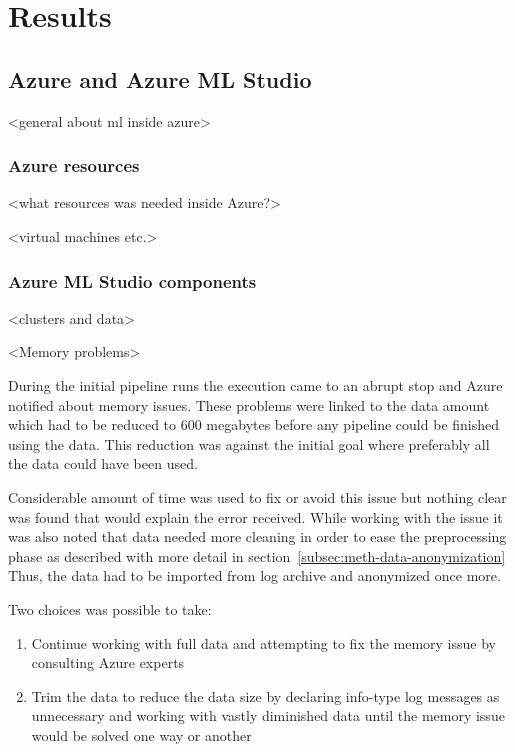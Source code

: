

\section{Results}\label{sec:results}


\subsection{Azure and Azure ML Studio}\label{subsec:azure-and-azure-ml-studio}

<general about ml inside azure>

\subsubsection*{Azure resources}

<what resources was needed inside Azure?>

<virtual machines etc.>




\subsubsection*{Azure ML Studio components}
<clusters and data>

<Memory problems>

During the initial pipeline runs
the execution came to an abrupt stop
and Azure notified about memory issues.
These problems were linked to the data amount
which had to be reduced to 600 megabytes
before any pipeline could be finished using the data.
This reduction was against the initial goal
where preferably all the data could have been used.

Considerable amount of time was used
to fix or avoid this issue
but nothing clear was found
that would explain the error received.
While working with the issue
it was also noted
that data needed more cleaning
in order to ease the preprocessing phase
as described with more detail in section~\ref{subsec:meth-data-anonymization}
Thus,
the data had to be imported from log archive
and anonymized once more.

Two choices was possible to take:
\begin{enumerate}
    \item Continue working with full data
    and attempting to fix the memory issue
    by consulting Azure experts
    \item  Trim the data to reduce the data size
    by declaring info-type log messages
    as unnecessary
    and working with vastly diminished data
    until the memory issue would be solved
    one way or another
\end{enumerate}


